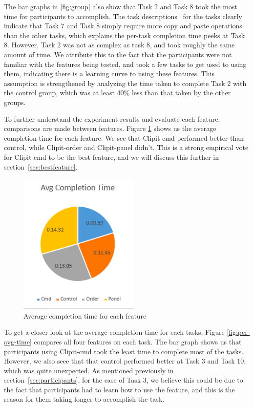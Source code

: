 \documentclass{acm_proc_article-sp}
\begin{document}
The bar graphs in \ref{fig:group} also show that Task 2 and Task 8 took the most time for participants to accomplish. The task descriptions~\cite{Tasks} for the tasks clearly indicate that Task 7 and Task 8 simply require more copy and paste operations than the other tasks, which explains the per-task completion time peeks at Task 8. However, Task 2 was not as complex as task 8, and took roughly the same amount of time. We attribute this to the fact that the participants were not familiar with the features being tested, and took a few tasks to get used to using them, indicating there is a learning curve to using these features. This assumption is strengthened by analyzing the time taken to complete Task 2 with the control group, which was at least 40\% less than that taken by the other groups.

To further understand the experiment results and evaluate each feature, comparisons are made between features. Figure \ref{fig:avg-time} shows us the average completion time for each feature. We see that Clipit-cmd performed better than control, while Clipit-order and Clipit-panel didn't. This is a strong empirical vote for Clipit-cmd to be the best feature, and we will discuss this further in section~\ref{sec:bestfeature}.

\begin{figure}[h]
\centering
\includegraphics[width=6cm]{avg_time}
\caption{Average completion time for each feature}
\label{fig:avg-time}
\end{figure}

To get a closer look at the average completion time for each tasks, Figure \ref{fig:per-avg-time} compares all four features on each task. The bar graph shows us that participants using Clipit-cmd took the least time to complete most of the tasks. However, we also seee that that control performed better at Task 3 and Task 10, which was quite unexpected. As mentioned previously in section~\ref{sec:participants}, for the case of Task 3, we believe this could be due to the fact that participants had to learn how to use the feature, and this is the reason for them taking longer to accomplish the task.
\end{document}
